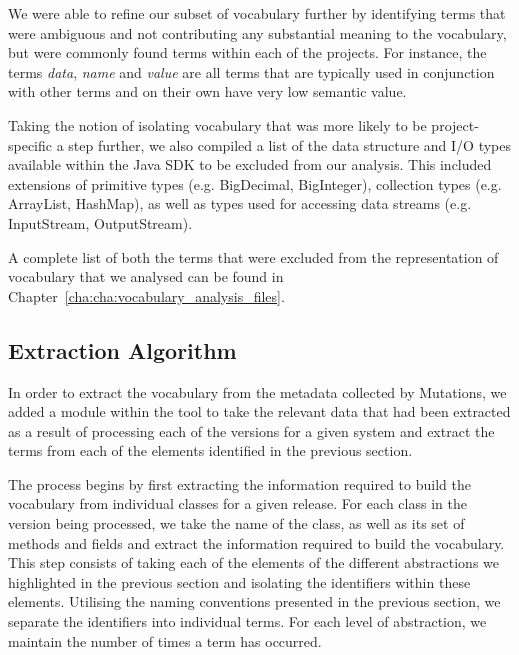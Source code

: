 We were able to refine our subset of vocabulary further by identifying terms that were ambiguous and not contributing any substantial meaning to the vocabulary, but were commonly found terms within each of the projects. For instance, the terms \emph{data}, \emph{name} and \emph{value} are all terms that are typically used in conjunction with other terms and on their own have very low semantic value.

Taking the notion of isolating vocabulary that was more likely to be project-specific a step further, we also compiled a list of the data structure and I/O types available within the Java SDK to be excluded from our analysis. This included extensions of primitive types (e.g. BigDecimal, BigInteger), collection types (e.g. ArrayList, HashMap), as well as types used for accessing data streams (e.g. InputStream, OutputStream).

A complete list of both the terms that were excluded from the representation of vocabulary that we analysed can be found in Chapter~\ref{cha:cha:vocabulary_analysis_files}.



\subsection{Extraction Algorithm} %
\label{sub:extraction_algorithm}

In order to extract the vocabulary from the metadata collected by Mutations, we added a module within the tool to take the relevant data that had been extracted as a result of processing each of the versions for a given system and extract the terms from each of the elements identified in the previous section.

The process begins by first extracting the information required to build the vocabulary from individual classes for a given release. For each class in the version being processed, we take the name of the class, as well as its set of methods and fields and extract the information required to build the vocabulary. This step consists of taking each of the elements of the different abstractions we highlighted in the previous section and isolating the identifiers within these elements. Utilising the naming conventions presented in the previous section, we separate the identifiers into individual terms. For each level of abstraction, we maintain the number of times a term has occurred.

